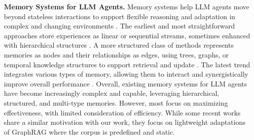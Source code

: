 
\noindent \textbf{Memory Systems for LLM Agents.}
Memory systems help LLM agents move beyond stateless interactions to support flexible reasoning and adaptation in complex and changing environments \citep{liu2025advances, mei2025survey}. The earliest and most straightforward approaches store experiences as linear or sequential streams, sometimes enhanced with hierarchical structures \citep{Liang2023SCMEL, DBLP:conf/uist/ParkOCMLB23, Packer2023MemGPTTL, DBLP:conf/aaai/ZhongGGYW24, Salama2025MemInsightAM,fang2025mempexploringagentprocedural}. A more structured class of methods represents memories as nodes and their relationships as edges, using trees, graphs, or temporal knowledge structures to support retrieval and update \citep{DBLP:conf/iclr/RezazadehLWB25, Chhikara2025Mem0BP, rasmussen2025zep, Xu2025AMEMAM, zhang2025g}. The latest trend integrates various types of memory, allowing them to interact and synergistically improve overall performance \citep{Kang2025MemoryOO, Li2025MemOSAO, wang2025mirix, nan2025nemori}. Overall, existing memory systems for LLM agents have become increasingly complex and capable, leveraging hierarchical, structured, and multi-type memories. However, most focus on maximizing effectiveness, with limited consideration of efficiency. While some recent works \citep{guo2024lightrag, zhao20252graphrag, dong2025youtu} share a similar motivation with our work, they focus on lightweight adaptations of GraphRAG where the corpus is predefined and static. 

